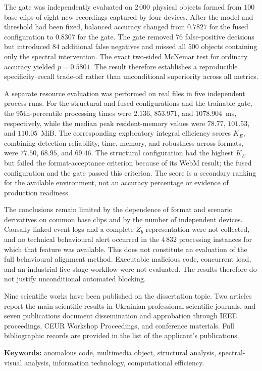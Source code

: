 The gate was independently evaluated on $2\,000$ physical objects formed from $100$ base clips of eight new recordings captured by four devices. After the model and threshold had been fixed, balanced accuracy changed from $0.7827$ for the fused configuration to $0.8307$ for the gate. The gate removed $76$ false-positive decisions but introduced $84$ additional false negatives and missed all $500$ objects containing only the spectral intervention. The exact two-sided McNemar test for ordinary accuracy yielded $p=0.5801$. The result therefore establishes a reproducible specificity--recall trade-off rather than unconditional superiority across all metrics.

A separate resource evaluation was performed on real files in five independent process runs. For the structural and fused configurations and the trainable gate, the 95th-percentile processing times were $2.136$, $853.971$, and $1078.904$~ms, respectively, while the median peak resident-memory values were $78.77$, $101.53$, and $110.05$~MiB. The corresponding exploratory integral efficiency scores $K_E$, combining detection reliability, time, memory, and robustness across formats, were $77.50$, $68.95$, and $69.46$. The structural configuration had the highest $K_E$ but failed the format-acceptance criterion because of its WebM result; the fused configuration and the gate passed this criterion. The score is a secondary ranking for the available environment, not an accuracy percentage or evidence of production readiness.

The conclusions remain limited by the dependence of format and scenario derivatives on common base clips and by the number of independent devices. Causally linked event logs and a complete $Z_b$ representation were not collected, and no technical behavioural alert occurred in the $4\,832$ processing instances for which that feature was available. This does not constitute an evaluation of the full behavioural alignment method. Executable malicious code, concurrent load, and an industrial five-stage workflow were not evaluated. The results therefore do not justify unconditional automated blocking.

Nine scientific works have been published on the dissertation topic. Two articles report the main scientific results in Ukrainian professional scientific journals, and seven publications document dissemination and approbation through IEEE proceedings, CEUR Workshop Proceedings, and conference materials. Full bibliographic records are provided in the list of the applicant’s publications.

\textbf{Keywords:} anomalous code, multimedia object, structural analysis, spectral-visual analysis, information technology, computational efficiency.

\clearpage
